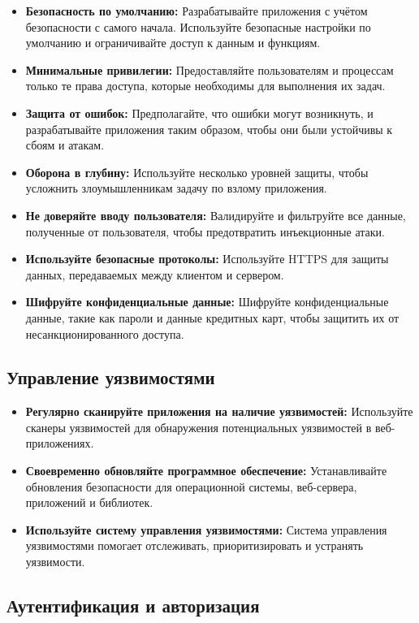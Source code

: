 \documentclass[a4paper,12pt]{diplom}
\begin{document}
	 \begin{itemize}
	 	\item \textbf{Безопасность по умолчанию:} Разрабатывайте приложения с учётом безопасности с самого начала. Используйте безопасные настройки по умолчанию и ограничивайте доступ к данным и функциям.
	 	\item \textbf{Минимальные привилегии:} Предоставляйте пользователям и процессам только те права доступа, которые необходимы для выполнения их задач.
	 	\item \textbf{Защита от ошибок:} Предполагайте, что ошибки могут возникнуть, и разрабатывайте приложения таким образом, чтобы они были устойчивы к сбоям и атакам.
	 	\item \textbf{Оборона в глубину:} Используйте несколько уровней защиты, чтобы усложнить злоумышленникам задачу по взлому приложения.
	 	\item \textbf{Не доверяйте вводу пользователя:} Валидируйте и фильтруйте все данные, полученные от пользователя, чтобы предотвратить инъекционные атаки.
	 	\item \textbf{Используйте безопасные протоколы:} Используйте HTTPS для защиты данных, передаваемых между клиентом и сервером.
	 	\item \textbf{Шифруйте конфиденциальные данные:} Шифруйте конфиденциальные данные, такие как пароли и данные кредитных карт, чтобы защитить их от несанкционированного доступа.
	 \end{itemize}
	 
	 \subsection{Управление уязвимостями}
	 
	 \begin{itemize}
	 	\item \textbf{Регулярно сканируйте приложения на наличие уязвимостей:} Используйте сканеры уязвимостей для обнаружения потенциальных уязвимостей в веб-приложениях.
	 	\item \textbf{Своевременно обновляйте программное обеспечение:} Устанавливайте обновления безопасности для операционной системы, веб-сервера, приложений и библиотек.
	 	\item \textbf{Используйте систему управления уязвимостями:} Система управления уязвимостями помогает отслеживать, приоритизировать и устранять уязвимости.
	 \end{itemize}
	 
	 \subsection{Аутентификация и авторизация}
	 
\end{document}
